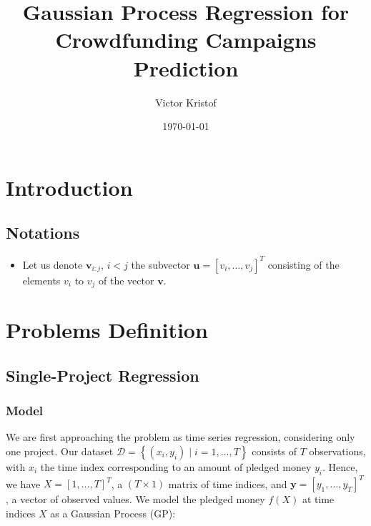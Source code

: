 \documentclass[11pt, oneside]{article}   	%
\title{Gaussian Process Regression for Crowdfunding Campaigns Prediction}
\author{Victor Kristof}
\date{\today}								%
\begin{document}
    \maketitle
    \newpage
    \tableofcontents
    \newpage
    \section{Introduction}
        \subsection{Notations}
        
            \begin{itemize}
                \item Let us denote $\mathbf{v}_{i:j}$, $i < j$ the subvector $\mathbf{u} = [v_i, ..., v_j]^T$ consisting of the elements $v_i$ to $v_j$ of the vector $\mathbf{v}$.
            \end{itemize}
        
    \section{Problems Definition}
    
	\subsection{Single-Project Regression}
        
		\subsubsection*{Model}
             
                    We are first approaching the problem as time series regression, considering only one project. Our dataset $\mathcal{D} = \left\{ (x_i, y_i) \mid i = 1, ..., T \right\}$ consists of $T$ observations, with $x_i$ the time index corresponding to an amount of pledged money $y_i$. Hence, we have $X = [1, ..., T]^T$, a $(T \times 1)$ matrix of time indices, and $\mathbf{y} = [y_1, ..., y_T]^T$, a vector of observed values. We model the pledged money $f(X)$ at time indices $X$ as a Gaussian Process (GP):
                    
\end{document}
